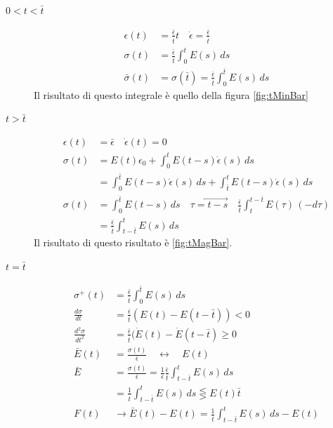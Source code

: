 \begin{description}
\item[$0<t<\bar{t}$]
\begin{equation}
\begin{split}
\epsilon(t)&=\frac{\bar{\epsilon}}{\bar{t}}t \quad \dot{\epsilon}=\frac{\bar{\epsilon}}{\bar{t}}\\
\sigma(t)&=\frac{\bar{\epsilon}}{\bar{t}}\int_0^t{E(s)\,ds}\\
\bar{\sigma}(t)&=\sigma(\bar{t})=\frac{\bar{\epsilon}}{\bar{t}}\int_0^{\bar{t}}{E(s)\,ds}
\end{split}
\end{equation}
Il risultato di questo integrale è quello della figura \ref{fig:tMinBar}
\item[$t>\bar{t}$]
\begin{equation}
\begin{split}
\epsilon(t)&=\bar{\epsilon} \quad \dot{\epsilon}(t)=0\\
\sigma(t)&=E(t)\epsilon_0 + \int_0^t{E(t-s)\dot{\epsilon}(s)\,ds}\\
&=\int_0^{\bar{t}}{E(t-s)\dot{\epsilon}(s)\,ds} + \int_{\bar{t}}^t{E(t-s)\dot{\epsilon}(s)\,ds}\\
\sigma(t)&=\int_0^{\bar{t}}{E(t-s)\,ds} \quad\overrightarrow{\tau = t-s}\quad \frac{\bar{\epsilon}}{\bar{t}}\int_t^{t-\bar{t}}{E(\tau)\,(-d\tau)}\\
&= \frac{\bar{\epsilon}}{\bar{t}}\int_{t-\bar{t}}^t{E(s)\,ds}
\end{split}
\end{equation}
Il risultato di questo risultato è \ref{fig:tMagBar}.
\item[$t=\bar{t}$]
\begin{equation}
\begin{split}
\sigma^+(t) &= \frac{\bar{\epsilon}}{\bar{t}}\int_0^{\bar{t}}{E(s)\,ds}\\
\frac{d\sigma}{dt}&=\frac{\bar{\epsilon}}{\bar{t}}(E(t)-E(t-\bar{t}))<0\\
\frac{d^2\sigma}{dt^2}&=\frac{\bar{\epsilon}}{\bar{t}}(\dot{E}(t)-\dot{E}(t-\bar{t})\geq 0\\
\bar{E}(t)&= \frac{\sigma(t)}{\bar{\epsilon}} \quad \leftrightarrow \quad E(t)\\
\bar{E}&=\frac{\sigma(t)}{\bar{\epsilon}} = \frac{1}{\bar{\epsilon}}\frac{\bar{\epsilon}}{\bar{t}}\int_{t-\bar{t}}^t{E(s)\,ds}\\
&=\frac{1}{\bar{t}}\int_{t-\bar{t}}^t{E(s)\,ds}\lesseqgtr E(t)\bar{t}\\
F(t)&\rightarrow \bar{E}(t)-E(t) = \frac{1}{\bar{t}}\int_{t-\bar{t}}^t{E(s)\,ds} - E(t)\\

\end{split}
\end{equation}
\end{description}

